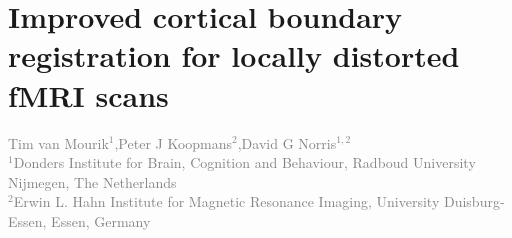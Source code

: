 
\chapter{Improved cortical boundary registration for locally distorted fMRI scans}

\textcolor{gray}{{Tim van Mourik$^{1}$},Peter J Koopmans$^{2}$,David G Norris$^{1,2}$\\
$^{1}$Donders Institute for Brain, Cognition and Behaviour, Radboud University Nijmegen, The Netherlands\\
$^{2}$Erwin L. Hahn Institute for Magnetic Resonance Imaging, University Duisburg-Essen, Essen, Germany}\\

\linespread{1.5}
\newpage








